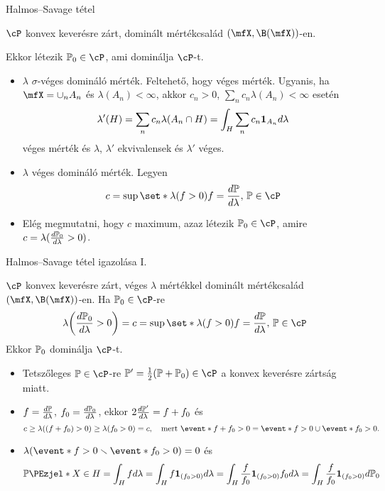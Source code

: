 \documentclass[aspectratio=169,notheorems,9pt,\option]{beamer}
\begin{document}
\begin{frame}{Halmos--Savage tétel}
\begin{theorem}
  $\cP$ konvex keverésre zárt, dominált mértékcsalád $(\mfX,\B(\mfX))$-en. 
  
  Ekkor létezik $\P[0]\in\cP$, ami dominálja $\cP$-t.
\end{theorem}
\begin{itemize}
  \item $\lambda$ $\sigma$-véges domináló mérték. Feltehető, hogy véges mérték. Ugyanis,
   ha $\mfX=\cup_n A_n$ és $\lambda(A_n)<\infty$, akkor 
   $c_n>0$, $\sum_n c_n\lambda(A_n)<\infty$ esetén
   \begin{displaymath}
     \lambda'(H)=\sum_n c_n \lambda(A_n\cap H)=\int_H \sum_n c_n\I[A_n] d\lambda
   \end{displaymath}
   véges mérték és $\lambda$, $\lambda'$ ekvivalensek és $\lambda'$ véges.
   \item $\lambda$ véges domináló mérték. Legyen
   \begin{displaymath}
    c=\sup\set*{\lambda(f>0)}{f=\frac{d\P}{d\lambda},\,\P\in\cP}
   \end{displaymath}
   \item Elég megmutatni, hogy $c$ maximum, 
   azaz létezik $\P[0]\in\cP$, amire $c=\lambda(\frac{d\P[0]}{d\lambda}>0)$.     
\end{itemize}

\end{frame}

\begin{frame}{Halmos--Savage tétel igazolása I.}
\begin{lemma}
  $\cP$ konvex keverésre zárt, véges $\lambda$ mértékkel dominált mértékcsalád 
  $(\mfX,\B(\mfX))$-en. Ha $\P[0]\in\cP$-re
  \begin{displaymath}
    \lambda\zjel*{\frac{d\P[0]}{d\lambda}>0}=c=\sup\set*{\lambda(f>0)}{f=\frac{d\P}{d\lambda},\,\P\in\cP}
  \end{displaymath}
  Ekkor $\P[0]$ dominálja $\cP$-t.
\end{lemma}
\begin{itemize}
  \item Tetszőleges $\P\in\cP$-re $\P'=\frac12(\P+\P[0])\in\cP$ a konvex keverésre zártság miatt.
  \item $f=\frac{d\P}{d\lambda}$, $f_0=\frac{d\P[0]}{d\lambda}$, 
  ekkor $2\frac{d\P'}{d\lambda}=f+f_0$ és 
  \begin{displaymath}
    c\geq \lambda((f+f_0)>0)\geq \lambda(f_0>0)=c, 
    \quad\text{mert $\event*{f+f_0>0}=\event*{f>0}\cup\event*{f_0>0}$}.
  \end{displaymath}
  \item $\lambda(\event*{f>0}\setminus\event*{f_0>0})=0$ és 
  \begin{displaymath}
    \P{X\in H}
    =\int_H f d\lambda
    =\int_H f\I{f_0>0}d\lambda
    =\int_H \frac{f}{f_0}\I{f_0>0}f_0d\lambda
    =\int_H \frac{f}{f_0}\I{f_0>0}d\P[0]
  \end{displaymath} 
\end{itemize}
\end{frame}
\end{document}
